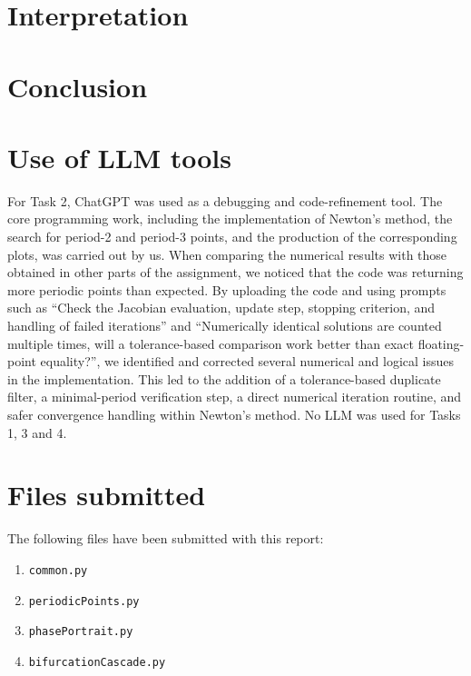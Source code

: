 \section{Interpretation}


\newpage
\section{Conclusion}


\section{Use of LLM tools}


For Task 2, ChatGPT was used as a debugging and code-refinement tool. The core programming work, including the implementation of Newton’s method, the search for period-2 and period-3 points, and the production of the corresponding plots, was carried out by us. When comparing the numerical results with those obtained in other parts of the assignment, we noticed that the code was returning more periodic points than expected. By uploading the code and using prompts such as “Check the Jacobian evaluation, update step, stopping criterion, and handling of failed iterations” and “Numerically identical solutions are counted multiple times, will a tolerance-based comparison work better than exact floating-point equality?”, we identified and corrected several numerical and logical issues in the implementation. This led to the addition of a tolerance-based duplicate filter, a minimal-period verification step, a direct numerical iteration routine, and safer convergence handling within Newton’s method.
No LLM was used for Tasks 1, 3 and 4. 

\section*{Files submitted}
The following files have been submitted with this report: \\
\begin{enumerate}
  \item \verb+common.py+
  \item \verb+periodicPoints.py+
  \item \verb+phasePortrait.py+
  \item \verb+bifurcationCascade.py+
\end{enumerate}


